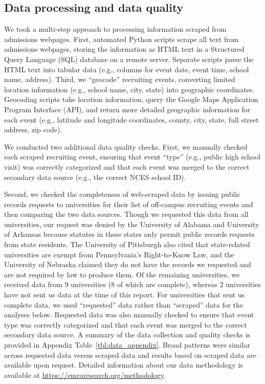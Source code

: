 \documentclass[twoside]{article}
\begin{document}

\subsection*{Data processing and data quality}

We took a multi-step approach to processing information scraped from admissions webpages. First, automated Python scripts scrape all text from admissions webpages, storing the information as HTML text in a Structured Query Language (SQL) database on a remote server. Separate scripts parse the HTML text into tabular data (e.g., columns for event date, event time, school name, address). Third, we ``geocode'' recruiting events, converting limited location information (e.g., school name, city, state) into geographic coordinates. Geocoding scripts take location information, query the Google Maps Application Program Interface (API), and return more detailed geographic information for each event (e.g., latitude and longitude coordinates, county, city, state, full street address, zip code).

We conducted two additional data quality checks. First, we manually checked each scraped recruiting event, ensuring that event ``type'' (e.g., public high school visit) was correctly categorized and that each event was merged to the correct secondary data source (e.g., the correct NCES school ID).

Second, we checked the completeness of web-scraped data by issuing public records requests to universities for their list of off-campus recruiting events and then comparing the two data sources. Though we requested this data from all universities, our request was denied by the University of Alabama and University of Arkansas because statutes in these states only permit public records requests from state residents. The University of Pittsburgh also cited that state-related universities are exempt from Pennsylvania's Right-to-Know Law, and the University of Nebraska claimed they do not have the records we requested and are not required by law to produce them. Of the remaining universities, we received data from 9 universities (8 of which are complete), whereas 2 universities have not sent us data at the time of this report. For universities that sent us complete data, we used ``requested'' data rather than ``scraped'' data for the analyses below. Requested data was also manually checked to ensure that event type was correctly categorized and that each event was merged to the correct secondary data source. A summary of the data collection and quality checks is provided in Appendix Table~\ref{tbl:data_appendix}. Broad patterns were similar across requested data versus scraped data and results based on scraped data are available upon request. Detailed information about our data methodology is available at \href{https://emraresearch.org/methodology}{https://emraresearch.org/methodology}.
\end{document}

